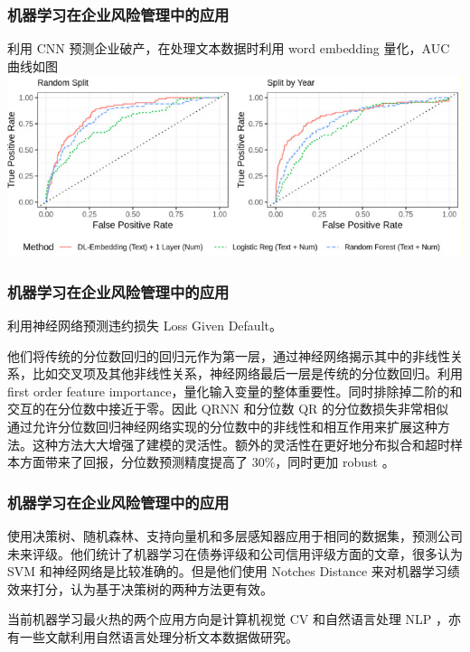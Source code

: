\documentclass{ctexbeamer}
\begin{document}
\begin{frame}
    \frametitle{机器学习在企业风险管理中的应用}
    \Textcite{mai2019deep} 利用 CNN 预测企业破产，在处理文本数据时利用 word embedding 量化，AUC 曲线如图
    \includegraphics[width=\linewidth]{../lib/mlinerm.jpg}
\end{frame}
\begin{frame}
    \frametitle{机器学习在企业风险管理中的应用}
    \Textcite{kellner2022opening} 利用神经网络预测违约损失 Loss Given Default。

    他们将传统的分位数回归的回归元作为第一层，通过神经网络揭示其中的非线性关系，比如交叉项及其他非线性关系，神经网络最后一层是传统的分位数回归。利用 first order feature importance，量化输入变量的整体重要性。同时排除掉二阶的和交互的在分位数中接近于零。因此 QRNN 和分位数 QR 的分位数损失非常相似
    通过允许分位数回归神经网络实现的分位数中的非线性和相互作用来扩展这种方法。这种方法大大增强了建模的灵活性。额外的灵活性在更好地分布拟合和超时样本方面带来了回报，分位数预测精度提高了 30\%，同时更加 robust 。
\end{frame}
\begin{frame}
    \frametitle{机器学习在企业风险管理中的应用}
    \Textcite{golbayani2020comparative}
    使用决策树、随机森林、支持向量机和多层感知器应用于相同的数据集，预测公司未来评级。他们统计了机器学习在债券评级和公司信用评级方面的文章，很多认为 SVM 和神经网络是比较准确的。但是他们使用 Notches Distance 来对机器学习绩效来打分，认为基于决策树的两种方法更有效。

    当前机器学习最火热的两个应用方向是计算机视觉 CV 和自然语言处理 NLP ，亦有一些文献利用自然语言处理分析文本数据做研究。
\end{frame}


\end{document}
